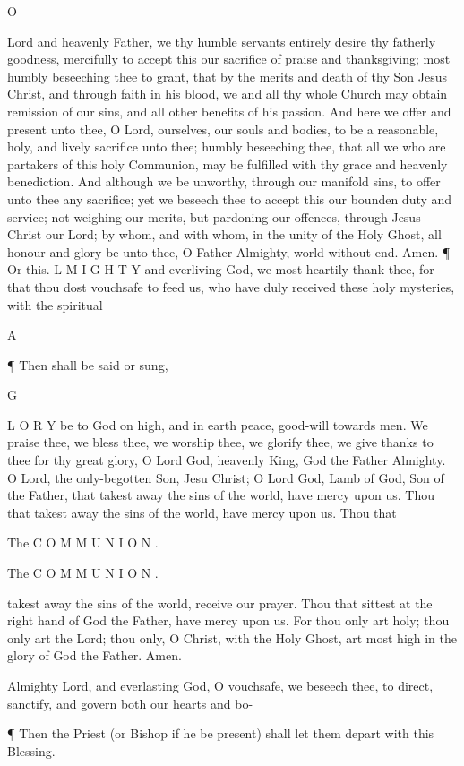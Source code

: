 O

Lord and heavenly Father, we thy humble servants entirely desire thy fatherly goodness, mercifully to accept this our sacrifice of praise and thanksgiving; most humbly beseeching thee to grant, that by the merits and death of thy Son Jesus Christ, and through faith in his blood, we and all thy whole Church may obtain remission of our sins, and all other benefits of his passion. And here we offer and present unto thee, O Lord, ourselves, our souls and bodies, to be a reasonable, holy, and lively sacrifice unto thee; humbly beseeching thee, that all we who are partakers of this holy Communion, may be fulfilled with thy grace and heavenly benediction. And although we be unworthy, through our manifold sins, to offer unto thee any sacrifice; yet we beseech thee to accept this our bounden duty and service; not weighing our merits, but pardoning our offences, through Jesus Christ our Lord; by whom, and with whom, in the unity of the Holy Ghost, all honour and glory be unto thee, O Father Almighty, world without end. Amen. ¶ Or this. L M I G H T Y and everliving God, we most heartily thank thee, for that thou dost vouchsafe to feed us, who have duly received these holy mysteries, with the spiritual

A

¶ Then shall be said or sung,

G

L O R Y be to God on high, and in earth peace, good-will towards men. We praise thee, we bless thee, we worship thee, we glorify thee, we give thanks to thee for thy great glory, O Lord God, heavenly King, God the Father Almighty. O Lord, the only-begotten Son, Jesu Christ; O Lord God, Lamb of God, Son of the Father, that takest away the sins of the world, have mercy upon us. Thou that takest away the sins of the world, have mercy upon us. Thou that

The C O M M U N I O N .

The C O M M U N I O N .

takest away the sins of the world, receive our prayer. Thou that sittest at the right hand of God the Father, have mercy upon us. For thou only art holy; thou only art the Lord; thou only, O Christ, with the Holy Ghost, art most high in the glory of God the Father. Amen.

Almighty Lord, and everlasting God, O vouchsafe, we beseech thee, to direct, sanctify, and govern both our hearts and bo-

¶ Then the Priest (or Bishop if he be present) shall let them depart with this Blessing.

